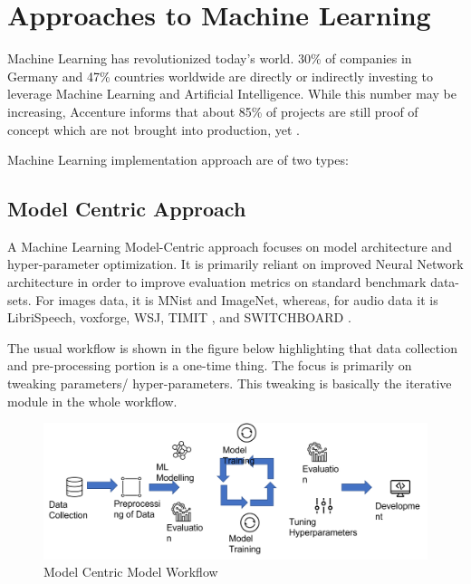 \section{Approaches to Machine Learning}
\label{cha:approaches_to_ML}

Machine Learning has revolutionized today's world. 30\% of companies in Germany \cite{noauthor_kunstliche_nodate} and 47\% countries worldwide \cite{noauthor_adoption_nodate} are directly or indirectly investing to leverage Machine Learning and Artificial Intelligence. While this number may be increasing, Accenture \cite{noauthor_scaling_nodate} informs that about 85\% of projects are still proof of concept which are not brought into production, yet \cite{noauthor_data-centric_nodate}.

Machine Learning implementation approach are of two types:

\subsection{Model Centric Approach}
\label{sub:Model_centric_approach}

A Machine Learning Model-Centric approach focuses on model architecture and hyper-parameter optimization. It is primarily reliant on improved Neural Network architecture in order to improve evaluation metrics on standard benchmark data-sets. For images data, it is MNist and ImageNet, whereas, for audio data it is LibriSpeech\cite{panayotov_librispeech_2015}, voxforge, WSJ, TIMIT \cite{garofolo_john_s_timit_1993}, and SWITCHBOARD \cite{godfrey_switchboard_1992}.

The usual workflow is shown in the figure below highlighting that data collection and pre-processing portion is a one-time thing. The focus is primarily on tweaking parameters/ hyper-parameters. This tweaking is basically the iterative module in the whole workflow.

\begin{figure}[h!]
    \centering
    \includegraphics[width=1.0\textwidth]{img/model_centric_ml.png}
    \caption{Model Centric Model Workflow}
    \label{fig:model-centric-workflow}
\end{figure}


